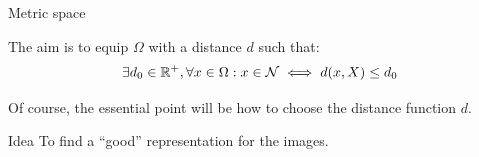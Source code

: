 \documentclass[xcolor=pdftex,dvipsnames,table,mathserif,aspectratio=169]{beamer}
\begin{document}
\begin{frame}{Metric space}

  The aim is to equip $\Omega$ with a distance $d$ such that:
  \[
  \exists d_0 \in \mathbb{R}^+,  \forall x \in \Omega: x \in \mathcal{N} \iff d(x, X) \leq d_0
  \]

  Of course, the essential point will be how to choose the distance function $d$.

  \begin{block}{Idea}
    To find a ``good'' representation for the images.
  \end{block}


\end{frame}



\end{document}
